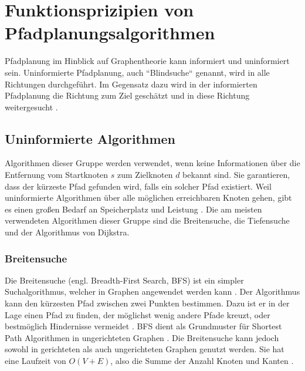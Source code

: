
\chapter{Funktionsprizipien von Pfadplanungsalgorithmen}

Pfadplanung im Hinblick auf Graphentheorie kann informiert und uninformiert sein. Uninformierte Pfadplanung, auch ``Blindsuche`` genannt, wird in alle Richtungen durchgeführt. Im Gegensatz dazu wird in der informierten Pfadplanung die Richtung zum Ziel geschätzt und in diese Richtung weitergesucht \cite{Man18}. %

\section{Uninformierte Algorithmen}
Algorithmen dieser Gruppe werden verwendet, wenn keine Informationen über die Entfernung vom Startknoten $s$ zum Zielknoten $d$ bekannt sind. Sie garantieren, dass der kürzeste Pfad gefunden wird, falls ein solcher Pfad existiert. Weil uninformierte Algorithmen über alle möglichen erreichbaren Knoten gehen, gibt es einen großen Bedarf an Speicherplatz und Leistung \cite{Noo15}. Die am meisten verwendeten Algorithmen dieser Gruppe sind die Breitensuche, die Tiefensuche und der Algorithmus von Dijkstra.

\subsection{Breitensuche}

Die Breitensuche (engl. Breadth-First Search, BFS) ist ein simpler Suchalgorithmus, welcher in Graphen angewendet werden kann \cite[S.594]{Cormen.2009}. Der Algorithmus kann den kürzesten Pfad zwischen zwei Punkten bestimmen. Dazu ist er in der Lage einen Pfad zu finden, der möglichst wenig andere Pfade kreuzt, oder bestmöglich Hindernisse vermeidet \cite{Lee.1961}. BFS dient als Grundmuster für Shortest Path Algorithmen in ungerichteten Graphen \cite{Ottmann.2017}. Die Breitensuche kann jedoch sowohl in gerichteten als auch ungerichteten Graphen genutzt werden. Sie hat eine Laufzeit von $O(V + E)$, also die Summe der Anzahl Knoten und Kanten \cite[S.597]{Cormen.2009}.

